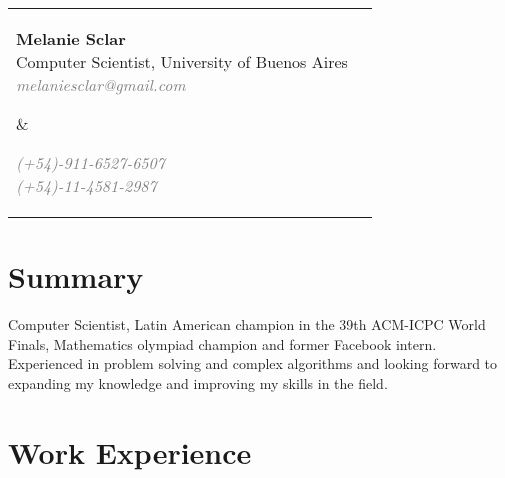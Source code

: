 \documentclass [a4paper, 11pt]{article}
\begin{document}
\noindent \begin{tabularx}{\textwidth}{X r}
  \hspace{-15pt}\parbox[t]{15cm}{
  \hspace{-2pt}\textbf{\huge{Melanie Sclar}} \\
  Computer Scientist, University of Buenos Aires \\
  \emph{ \textcolor{gray}{melaniesclar@gmail.com} }
  } &

\parbox[t]{3.8cm}{ \emph{\textcolor{gray}{
  (+54)-911-6527-6507 \\
  (+54)-11-4581-2987 }}
  
}
\end{tabularx}

\sectionfont{\sectionrule{0pt}{0pt}{-.2cm}{1pt}}
\section* {Summary}
Computer Scientist, Latin American champion in the 39th ACM-ICPC World Finals, Mathematics olympiad champion and former Facebook intern. Experienced in problem solving and complex algorithms and looking forward to expanding my knowledge and improving my skills in the field.

\section* {Work Experience}
\end{document}
